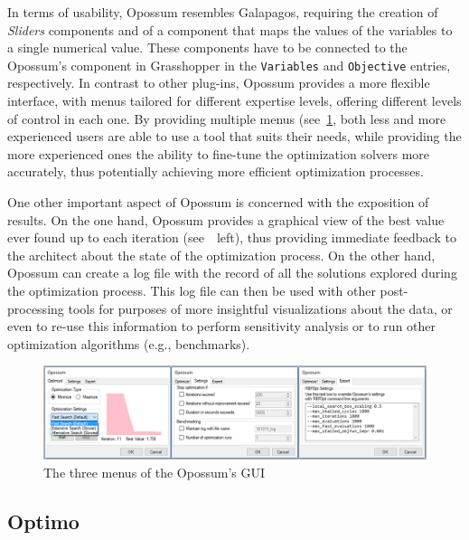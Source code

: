 	In terms of usability, Opossum resembles Galapagos, requiring the creation of \textit{Sliders} components and of a component that maps the values of the variables to a single numerical value. These components have to be connected to the Opossum's component in Grasshopper in the \texttt{Variables} and \texttt{Objective} entries, respectively. In contrast to other plug-ins, Opossum provides a more flexible interface, with menus tailored for different expertise levels, offering different levels of control in each one. By providing multiple menus (see~\cref{fig:opossum}, both less and more experienced users are able to use a tool that suits their needs, while providing the more experienced ones the ability to fine-tune the optimization solvers more accurately, thus potentially achieving more efficient optimization processes.
	
	One other important aspect of Opossum is concerned with the exposition of results. On the one hand, Opossum provides a graphical view of the best value ever found up to each iteration (see~\cite{fig:opossum}~left), thus providing immediate feedback to the architect about the state of the optimization process. On the other hand, Opossum can create a log file with the record of all the solutions explored during the optimization process. This log file can then be used with other post-processing tools for purposes of more insightful visualizations about the data, or even to re-use this information to perform sensitivity analysis or to run other optimization algorithms (e.g., benchmarks).
	
\begin{figure}
\centering
\includegraphics[width=1\textwidth]{Images/Background/Opossum/opossum_1.png}
\caption[Opossum optimization plug-in menus]{The three menus of the Opossum's \ac{GUI}}
\label{fig:opossum}
\end{figure}

\subsection{Optimo}
\label{subsec:Optimo}

